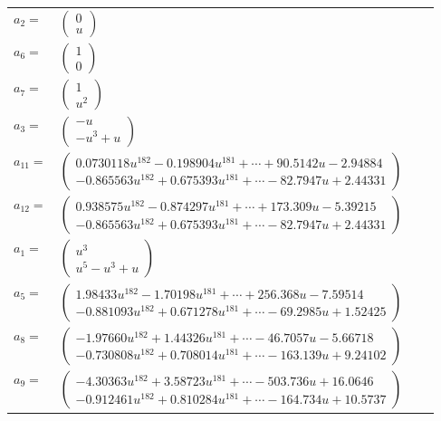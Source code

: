\documentclass[1p]{elsarticle_modified}
\theoremstyle{definition}
\begin{document}
\begin{tabular}{m{7pt} m{180pt} m{7pt} m{180pt} }
\flushright $a_{2}=$&$\begin{pmatrix}0\\u\end{pmatrix}$ \\
\flushright $a_{6}=$&$\begin{pmatrix}1\\0\end{pmatrix}$ \\
\flushright $a_{7}=$&$\begin{pmatrix}1\\u^2\end{pmatrix}$ \\
\flushright $a_{3}=$&$\begin{pmatrix}- u\\- u^3+u\end{pmatrix}$ \\
\flushright $a_{11}=$&$\begin{pmatrix}0.0730118 u^{182}-0.198904 u^{181}+\cdots+90.5142 u-2.94884\\-0.865563 u^{182}+0.675393 u^{181}+\cdots-82.7947 u+2.44331\end{pmatrix}$ \\
\flushright $a_{12}=$&$\begin{pmatrix}0.938575 u^{182}-0.874297 u^{181}+\cdots+173.309 u-5.39215\\-0.865563 u^{182}+0.675393 u^{181}+\cdots-82.7947 u+2.44331\end{pmatrix}$ \\
\flushright $a_{1}=$&$\begin{pmatrix}u^3\\u^5- u^3+u\end{pmatrix}$ \\
\flushright $a_{5}=$&$\begin{pmatrix}1.98433 u^{182}-1.70198 u^{181}+\cdots+256.368 u-7.59514\\-0.881093 u^{182}+0.671278 u^{181}+\cdots-69.2985 u+1.52425\end{pmatrix}$ \\
\flushright $a_{8}=$&$\begin{pmatrix}-1.97660 u^{182}+1.44326 u^{181}+\cdots-46.7057 u-5.66718\\-0.730808 u^{182}+0.708014 u^{181}+\cdots-163.139 u+9.24102\end{pmatrix}$ \\
\flushright $a_{9}=$&$\begin{pmatrix}-4.30363 u^{182}+3.58723 u^{181}+\cdots-503.736 u+16.0646\\-0.912461 u^{182}+0.810284 u^{181}+\cdots-164.734 u+10.5737\end{pmatrix}$ \\

\end{tabular}
\end{document}

